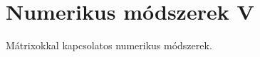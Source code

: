 \documentclass[../../main.tex]{subfiles}
\begin{document}
\section{Numerikus módszerek V}

\begin{fulltheorem}
	Mátrixokkal kapcsolatos numerikus módszerek.
\end{fulltheorem}
\end{document}
